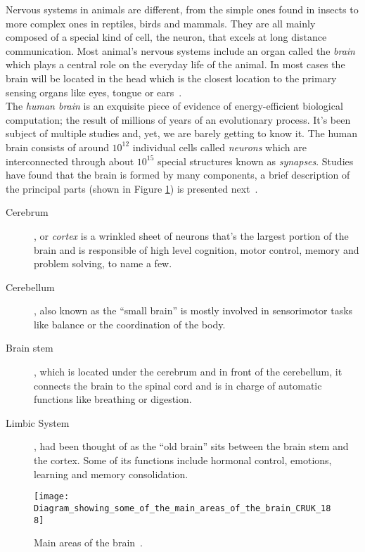 Nervous systems in animals are different, from the simple ones found in insects to more complex ones in reptiles, birds and mammals. They are all mainly composed of a special kind of cell, the neuron, that excels at long distance communication. Most animal's nervous systems include an organ called the \emph{brain} which plays a central role on the everyday life of the animal. In most cases the brain will be located in the head which is the closest location to the primary sensing organs like eyes, tongue or ears~\cite{scholarpedia-brain}.\\


The \emph{human brain} is an exquisite piece of evidence of energy-efficient biological computation; the result of millions of years of an evolutionary process. It's been subject of multiple studies and, yet, we are barely getting to know it. The human brain consists of around $10^{12}$ individual cells called \emph{neurons} which are interconnected through about $10^{15}$ special structures known as \emph{synapses}.
Studies have found that the brain is formed by many components, a brief description of the principal parts (shown in Figure \ref{fig:brain:components}) is presented next~\cite{thompson2000brain}. 
\begin{description}
  \item[Cerebrum], or \emph{cortex} is a wrinkled sheet of neurons that's the largest portion of the brain and is responsible of high level cognition, motor control, memory and problem solving, to name a few.
  \item[Cerebellum], also known as the ``small brain'' is mostly involved in sensorimotor tasks like balance or the coordination of the body.
  \item[Brain stem], which is located under the cerebrum and in front of the cerebellum, it connects the brain to the spinal cord and is in charge of automatic functions like breathing or digestion.
  \item[Limbic System], had been thought of as the ``old brain'' sits between the brain stem and the cortex. Some of its functions include hormonal control, emotions, learning and memory consolidation. 
\end{description}

\begin{figure}
  \begin{center}
    \texttt{[image: Diagram\_showing\_some\_of\_the\_main\_areas\_of\_the\_brain\_CRUK\_188]}
    \caption{Main areas of the brain~\cite{wikipedia-images}.}
    \label{fig:brain:components}
  \end{center}
  
\end{figure}

